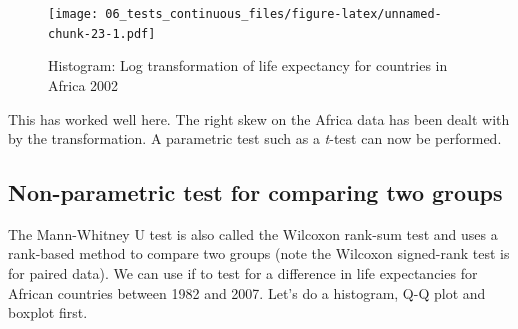 \documentclass[12pt,]{krantz}
\makeatletter
\newenvironment{Shaded}{\begin{snugshade}}{\end{snugshade}}
\newcommand{\CommentTok}[1]{\textcolor[rgb]{0.56,0.35,0.01}{\textit{#1}}}
\newcommand{\DataTypeTok}[1]{\textcolor[rgb]{0.13,0.29,0.53}{#1}}
\newcommand{\DecValTok}[1]{\textcolor[rgb]{0.00,0.00,0.81}{#1}}
\newcommand{\KeywordTok}[1]{\textcolor[rgb]{0.13,0.29,0.53}{\textbf{#1}}}
\newcommand{\NormalTok}[1]{#1}
\newcommand{\OperatorTok}[1]{\textcolor[rgb]{0.81,0.36,0.00}{\textbf{#1}}}
\newcommand{\StringTok}[1]{\textcolor[rgb]{0.31,0.60,0.02}{#1}}
\newenvironment{kframe}{%
\medskip{}
\setlength{\fboxsep}{.8em}
 \def\at@end@of@kframe{}%
 \ifinner\ifhmode%
  \def\at@end@of@kframe{\end{minipage}}%
  \begin{minipage}{\columnwidth}%
 \fi\fi%
 \def\FrameCommand##1{\hskip\@totalleftmargin \hskip-\fboxsep
 \colorbox{shadecolor}{##1}\hskip-\fboxsep
     \hskip-\linewidth \hskip-\@totalleftmargin \hskip\columnwidth}%
 \MakeFramed {\advance\hsize-\width
   \@totalleftmargin\z@ \linewidth\hsize
   \@setminipage}}%
 {\par\unskip\endMakeFramed%
 \at@end@of@kframe}
\renewenvironment{Shaded}{\begin{kframe}}{\end{kframe}}
\theoremstyle{definition}
\theoremstyle{definition}
\theoremstyle{definition}
\theoremstyle{remark}
\makeatother
\begin{document}
\begin{Shaded}
\end{Shaded}

\begin{figure}
\centering
\texttt{[image: 06\_tests\_continuous\_files/figure-latex/unnamed-chunk-23-1.pdf]}
\caption{\label{fig:unnamed-chunk-23}Histogram: Log transformation of life
expectancy for countries in Africa 2002}
\end{figure}

 
  
 

This has worked well here. The right skew on the Africa data has been
dealt with by the transformation. A parametric test such as a
\emph{t}-test can now be performed.

\hypertarget{non-parametric-test-for-comparing-two-groups}{%
\subsection{Non-parametric test for comparing two
groups}\label{non-parametric-test-for-comparing-two-groups}}


The Mann-Whitney U test is also called the Wilcoxon rank-sum test and
uses a rank-based method to compare two groups (note the Wilcoxon
signed-rank test is for paired data). We can use if to test for a
difference in life expectancies for African countries between 1982 and
2007. Let's do a histogram, Q-Q plot and boxplot first.
\end{document}
